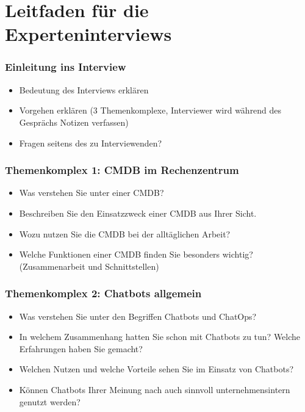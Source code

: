 \chapter{Leitfaden für die Experteninterviews} \label{Leitfaden}


\subsection*{Einleitung ins Interview}
\begin{itemize}
  \item Bedeutung des Interviews erklären
  \item Vorgehen erklären (3 Themenkomplexe, Interviewer wird während des Gesprächs Notizen verfassen)
  \item Fragen seitens des zu Interviewenden?
\end{itemize}


\subsection*{Themenkomplex 1: CMDB im Rechenzentrum}

\begin{itemize}
  \item Was verstehen Sie unter einer CMDB?
  \item Beschreiben Sie den Einsatzzweck einer CMDB aus Ihrer Sicht.
  \item Wozu nutzen Sie die CMDB bei der alltäglichen Arbeit?
  \item Welche Funktionen einer \acs{CMDB} finden Sie besonders wichtig? (Zusammenarbeit und Schnittstellen)
\end{itemize}


\subsection*{Themenkomplex 2: Chatbots allgemein}
\begin{itemize}
  \item Was verstehen Sie unter den Begriffen Chatbots und ChatOps?
  \item In welchem Zusammenhang hatten Sie schon mit Chatbots zu tun? Welche Erfahrungen haben Sie gemacht?
  \item Welchen Nutzen und welche Vorteile sehen Sie im Einsatz von Chatbots?
  \item Können Chatbots Ihrer Meinung nach auch sinnvoll unternehmensintern genutzt werden?
\end{itemize}


